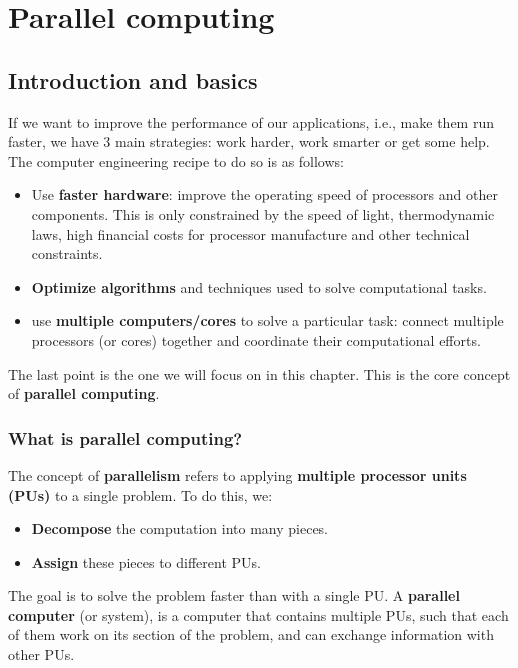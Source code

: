 \chapter{Parallel computing}

\section{Introduction and basics}

If we want to improve the performance of our applications, i.e., make them run faster,
we have 3 main strategies: work harder, work smarter or get some help. The computer
engineering recipe to do so is as follows:

\begin{itemize}
    \item Use \textbf{faster hardware}: improve the operating speed of processors and other
    components. This is only constrained by the speed of light, thermodynamic laws, high
    financial costs for processor manufacture and other technical constraints.
    
    \item \textbf{Optimize algorithms} and techniques used to solve computational tasks.
    
    \item use \textbf{multiple computers/cores} to solve a particular task: connect multiple
    processors (or cores) together and coordinate their computational efforts.
\end{itemize}

The last point is the one we will focus on in this chapter. This is the core concept of
\textbf{parallel computing}.

\subsection{What is parallel computing?}

The concept of \textbf{parallelism} refers to applying \textbf{multiple processor units (PUs)}
to a single problem. To do this, we:

\begin{itemize}
    \item \textbf{Decompose} the computation into many pieces.
    \item \textbf{Assign} these pieces to different PUs.
\end{itemize}

The goal is to solve the problem faster than with a single PU. A \textbf{parallel computer}
(or system), is a computer that contains multiple PUs, such that each of them work on its 
section of the problem, and can exchange information with other PUs.

